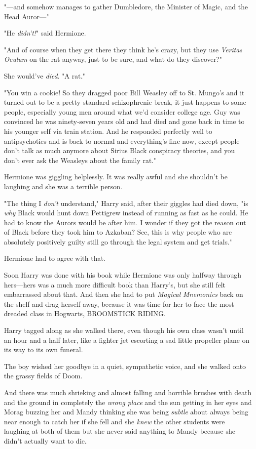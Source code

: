 "---and somehow manages to gather Dumbledore, the Minister of Magic, and the 
Head Auror---"

"He \emph{didn't!}" said Hermione.

"And of course when they get there they think he's crazy, but they use 
\emph{Veritas Oculum} on the rat anyway, just to be sure, and what do they 
discover?"

She would've \emph{died}. "A rat."

"You win a cookie! So they dragged poor Bill Weasley off to St. Mungo's and it 
turned out to be a pretty standard schizophrenic break, it just happens to some 
people, especially young men around what we'd consider college age. Guy was 
convinced he was ninety-seven years old and had died and gone back in time to 
his younger self via train station. And he responded perfectly well to 
antipsychotics and is back to normal and everything's fine now, except people 
don't talk as much anymore about Sirius Black conspiracy theories, and you 
don't ever ask the Weasleys about the family rat."

Hermione was giggling helplessly. It was really awful and she shouldn't be 
laughing and she was a terrible person.

"The thing I \emph{don't} understand," Harry said, after their giggles had died 
down, "is \emph{why} Black would hunt down Pettigrew instead of running as fast 
as he could. He had to know the Aurors would be after him. I wonder if they got 
the reason out of Black before they took him to Azkaban? See, this is why 
people who are absolutely positively guilty still go through the legal system 
and get trials."

Hermione had to agree with that.

Soon Harry was done with his book while Hermione was only halfway through 
hers---hers was a much more difficult book than Harry's, but she still felt 
embarrassed about that. And then she had to put \emph{Magical Mnemonics} back 
on the shelf and drag herself away, because it was time for her to face the 
most dreaded class in Hogwarts, BROOMSTICK RIDING.

Harry tagged along as she walked there, even though his own class wasn't until 
an hour and a half later, like a fighter jet escorting a sad little propeller 
plane on its way to its own funeral.

The boy wished her goodbye in a quiet, sympathetic voice, and she walked onto 
the grassy fields of Doom.

And there was much shrieking and almost falling and horrible brushes with death 
and the ground in completely the \emph{wrong place} and the sun getting in her 
eyes and Morag buzzing her and Mandy thinking she was being \emph{subtle} about 
always being near enough to catch her if she fell and she \emph{knew} the other 
students were laughing at both of them but she never said anything to Mandy 
because she didn't actually want to die.

